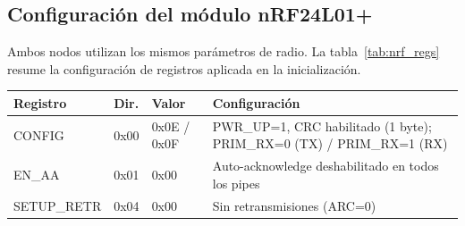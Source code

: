 \documentclass[12pt,a4paper]{article}
\begin{document}
  \subsection{Configuración del módulo nRF24L01+}                                                                                                                                                                                                             

  Ambos nodos utilizan los mismos parámetros de radio. La tabla~\ref{tab:nrf_regs} resume la configuración de registros aplicada en la inicialización.                                                                                                        
  
  \begin{table}[h]                                                                                                                                                                                                                                            
  \centering
  \begin{tabular}{lllp{6.5cm}}
  \hline                                                                                                                                                                                                                                                      
  \textbf{Registro} & \textbf{Dir.} & \textbf{Valor} & \textbf{Configuración} \\
  \hline                                                                                                                                                                                                                                                      
  CONFIG     & 0x00 & 0x0E / 0x0F & PWR\_UP=1, CRC habilitado (1 byte); PRIM\_RX=0 (TX) / PRIM\_RX=1 (RX) \\                                                                                                                                                  
  EN\_AA     & 0x01 & 0x00        & Auto-acknowledge deshabilitado en todos los pipes \\                                                                                                                                                                      
  SETUP\_RETR & 0x04 & 0x00       & Sin retransmisiones (ARC=0) \\                                                                                                                                                                                            

\end{tabular}
\end{table}
\end{document}
